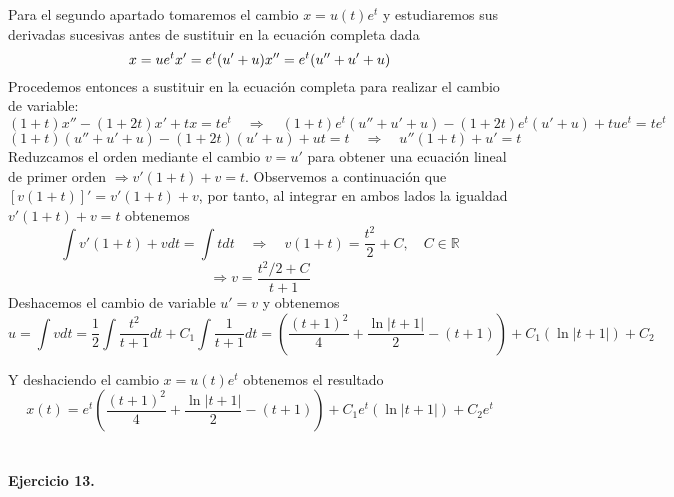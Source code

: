 \documentclass[fleqn]{article}
\def\R{\mathds{R}}
\begin{document}
    Para el segundo apartado tomaremos el cambio $x=u(t)e^t$ y estudiaremos sus derivadas sucesivas antes de sustituir en la ecuación completa dada
    \begin{equation*}
        x=ue^t\\
        x'=e^t(u' + u) \\
        x''=e^t(u'' + u' + u)\\
    \end{equation*}
    Procedemos entonces a sustituir en la ecuación completa para realizar el cambio de variable:
    $$(1+t)x'' - (1+2t)x' + tx = te^t \quad \Rightarrow \quad (1+t)e^t(u'' + u' + u) - (1+2t)e^t(u' + u) + tue^t = te^t$$
    $$(1+t)(u'' + u' + u) - (1+2t)(u' + u) + ut = t \quad \Rightarrow \quad u''(1+t)+u' = t$$
    Reduzcamos el orden mediante el cambio $v=u'$ para obtener una ecuación lineal de primer orden $\Rightarrow v'(1+t)+v = t$. Observemos a continuación que $[v(1+t)]' = v'(1+t)+v$, por
    tanto, al integrar en ambos lados la igualdad $v'(1+t)+v = t$ obtenemos
    $$\int v'(1+t)+v dt= \int t dt \quad \Rightarrow \quad v(1+t) = \frac{t^2}{2} + C, \quad C\in \R$$
    $$\Rightarrow v=\frac{t^2/2 + C}{t+1}$$
    Deshacemos el cambio de variable $u'=v$ y obtenemos 
    $$u = \int v dt = \frac{1}{2}\int \frac{t^2}{t+1}dt + C_1\int \frac{1}{t+1}dt = \left(\frac{(t+1)^2}{4} + \frac{\ln|t+1|}{2} - (t+1)\right) + C_1(\ln|t+1|) + C_2$$

    Y deshaciendo el cambio $x=u(t)e^t$ obtenemos el resultado
    $$x(t) =e^t\left(\frac{(t+1)^2}{4} + \frac{\ln|t+1|}{2} - (t+1)\right) + C_1e^t(\ln|t+1|) + C_2e^t$$\\ \\

    \textbf{Ejercicio 13.} \\

    
\end{document}
